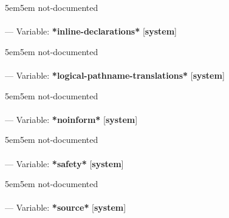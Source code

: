 \begin{adjustwidth}{5em}{5em}
not-documented
\end{adjustwidth}

\paragraph{}
\label{SYSTEM:*INLINE-DECLARATIONS*}
--- Variable: \textbf{*inline-declarations*} [\textbf{system}] \textit{}

\begin{adjustwidth}{5em}{5em}
not-documented
\end{adjustwidth}

\paragraph{}
\label{SYSTEM:*LOGICAL-PATHNAME-TRANSLATIONS*}
--- Variable: \textbf{*logical-pathname-translations*} [\textbf{system}] \textit{}

\begin{adjustwidth}{5em}{5em}
not-documented
\end{adjustwidth}

\paragraph{}
\label{SYSTEM:*NOINFORM*}
--- Variable: \textbf{*noinform*} [\textbf{system}] \textit{}

\begin{adjustwidth}{5em}{5em}
not-documented
\end{adjustwidth}

\paragraph{}
\label{SYSTEM:*SAFETY*}
--- Variable: \textbf{*safety*} [\textbf{system}] \textit{}

\begin{adjustwidth}{5em}{5em}
not-documented
\end{adjustwidth}

\paragraph{}
\label{SYSTEM:*SOURCE*}
--- Variable: \textbf{*source*} [\textbf{system}] \textit{}

